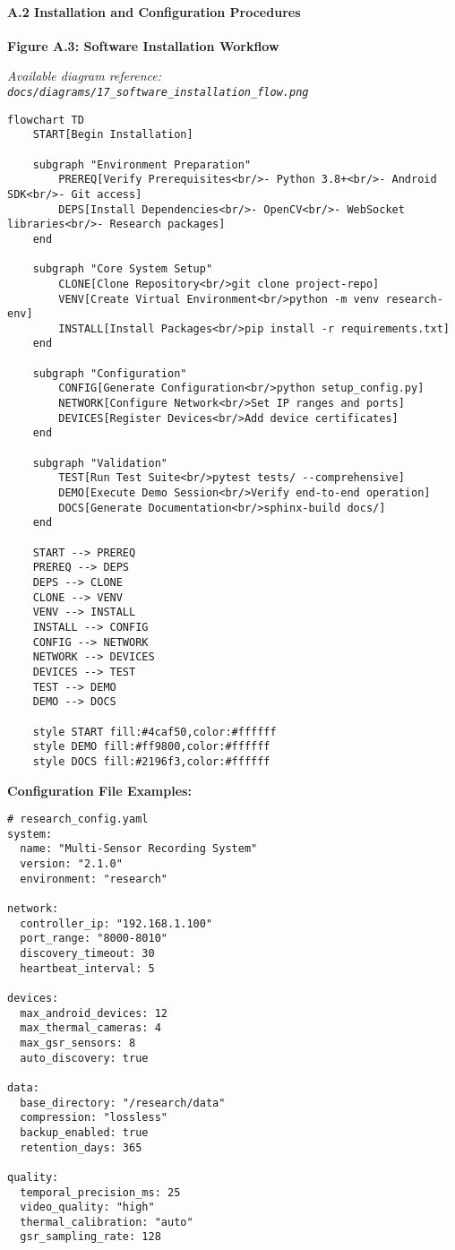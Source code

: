 \documentclass[11pt,a4paper]{article}
\begin{document}
\paragraph{A.2 Installation and Configuration Procedures}

\textbf{Figure A.3: Software Installation Workflow}

\textit{Available diagram reference: \texttt{docs/diagrams/17\_software\_installation\_flow.png}}

\begin{verbatim}
flowchart TD
    START[Begin Installation]

    subgraph "Environment Preparation"
        PREREQ[Verify Prerequisites<br/>- Python 3.8+<br/>- Android SDK<br/>- Git access]
        DEPS[Install Dependencies<br/>- OpenCV<br/>- WebSocket libraries<br/>- Research packages]
    end

    subgraph "Core System Setup"
        CLONE[Clone Repository<br/>git clone project-repo]
        VENV[Create Virtual Environment<br/>python -m venv research-env]
        INSTALL[Install Packages<br/>pip install -r requirements.txt]
    end

    subgraph "Configuration"
        CONFIG[Generate Configuration<br/>python setup_config.py]
        NETWORK[Configure Network<br/>Set IP ranges and ports]
        DEVICES[Register Devices<br/>Add device certificates]
    end

    subgraph "Validation"
        TEST[Run Test Suite<br/>pytest tests/ --comprehensive]
        DEMO[Execute Demo Session<br/>Verify end-to-end operation]
        DOCS[Generate Documentation<br/>sphinx-build docs/]
    end

    START --> PREREQ
    PREREQ --> DEPS
    DEPS --> CLONE
    CLONE --> VENV
    VENV --> INSTALL
    INSTALL --> CONFIG
    CONFIG --> NETWORK
    NETWORK --> DEVICES
    DEVICES --> TEST
    TEST --> DEMO
    DEMO --> DOCS

    style START fill:#4caf50,color:#ffffff
    style DEMO fill:#ff9800,color:#ffffff
    style DOCS fill:#2196f3,color:#ffffff
\end{verbatim}

\textbf{Configuration File Examples:}

\begin{verbatim}
# research_config.yaml
system:
  name: "Multi-Sensor Recording System"
  version: "2.1.0"
  environment: "research"

network:
  controller_ip: "192.168.1.100"
  port_range: "8000-8010"
  discovery_timeout: 30
  heartbeat_interval: 5

devices:
  max_android_devices: 12
  max_thermal_cameras: 4
  max_gsr_sensors: 8
  auto_discovery: true

data:
  base_directory: "/research/data"
  compression: "lossless"
  backup_enabled: true
  retention_days: 365

quality:
  temporal_precision_ms: 25
  video_quality: "high"
  thermal_calibration: "auto"
  gsr_sampling_rate: 128
\end{verbatim}
\end{document}
